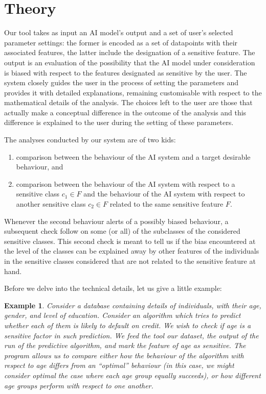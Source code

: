 \documentclass[
]{ceurart}
\newtheorem{example}{Example}
\begin{document}
\section{Theory}\label{sec:theory}

Our tool takes as input an AI model's output and a set of user's selected parameter settings: the former is encoded as a set of datapoints with their associated features, the latter include the designation of a sensitive feature. The output is an evaluation of the possibility that the AI model under consideration is biased with respect to the features designated as sensitive by the user. The system closely guides the user in the process of setting the parameters and provides it with detailed explanations, remaining customisable with respect to the mathematical details of the analysis. The choices left to the user are those that actually make a conceptual difference in the outcome of the analysis and this difference is explained to the user during the setting of these parameters.

The analyses conducted by our system are of two kids: 

\begin{enumerate}
	\item comparison between the behaviour of the AI system and a target desirable behaviour, and
	
	\item comparison between the behaviour of the AI system with respect to a sensitive class $c_1\in F$ and the behaviour of the AI system with respect to another sensitive class $c_2\in F$ related to the same sensitive feature $F$.
\end{enumerate}

Whenever the second behaviour alerts of a possibly biased behaviour, a subsequent check follow on some (or all) of the subclasses of the considered sensitive classes. This second check is meant to tell us if the bias encountered at the level of the classes can be explained away by other features of the individuals in the sensitive classes considered that are not related to the sensitive feature at hand.

Before we delve into the technical details, let us give a little example: 

\begin{example}
Consider a database containing details of individuals, with their age, gender, and level of education. Consider an algorithm which tries to predict whether each of them is likely to default on credit. We wish to check if age is a sensitive factor in such prediction. We feed the tool our dataset, the output of the run of the predictive algorithm, and mark the feature of age as sensitive. The program allows us to compare either how the behaviour of the algorithm with respect to age differs from an ``optimal'' behaviour (in this case, we might consider optimal the case where each age group equally succeeds), or how different age groups perform with respect to one another.
\end{example}
 
\end{document}
